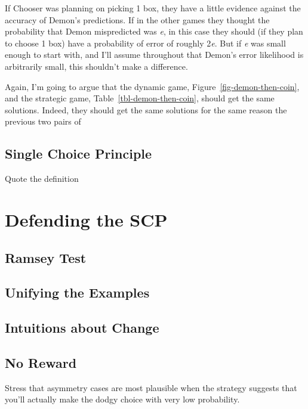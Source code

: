 \documentclass[
  10pt,
  letterpaper,
  DIV=11,
  numbers=noendperiod,
  twoside]{scrartcl}
\begin{document}
If Chooser was planning on picking 1 box, they have a little evidence
against the accuracy of Demon's predictions. If in the other games they
thought the probability that Demon mispredicted was \emph{e}, in this
case they should (if they plan to choose 1 box) have a probability of
error of roughly 2\emph{e}. But if \emph{e} was small enough to start
with, and I'll assume throughout that Demon's error likelihood is
arbitrarily small, this shouldn't make a difference.

Again, I'm going to argue that the dynamic game,
Figure~\ref{fig-demon-then-coin}, and the strategic game,
Table~\ref{tbl-demon-then-coin}, should get the same solutions. Indeed,
they should get the same solutions for the same reason the previous two
pairs of

\subsection{Single Choice Principle}\label{single-choice-principle}

Quote the definition

\section{Defending the SCP}\label{sec-scp-defence}

\subsection{Ramsey Test}\label{ramsey-test}

\subsection{Unifying the Examples}\label{unifying-the-examples}

\subsection{Intuitions about Change}\label{intuitions-about-change}

\subsection{No Reward}\label{no-reward}

Stress that asymmetry cases are most plausible when the strategy
suggests that you'll actually make the dodgy choice with very low
probability.
\end{document}

